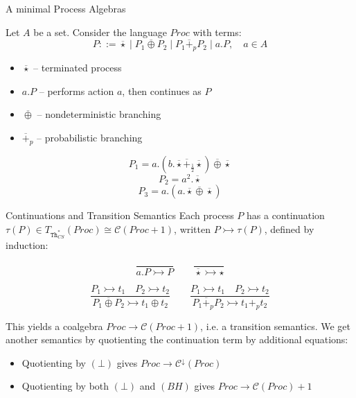 \documentclass{beamer}
\newcommand{\Th}{\mathtt{Th}}
\begin{document}
\begin{frame}{A minimal Process Algebras}

Let $A$ be a set. Consider the language $\mathit{Proc}$ with terms:
\[
P ::= \operatorname{\overline{\star}} \mid P_1 \mathbin{\overline{\oplus}} P_2 \mid P_1 \mathbin{\overline{+}_p} P_2 \mid a.P, \quad a \in A
\]

\pause

\begin{itemize}
    \item $\operatorname{\overline{\star}}$ -- terminated process
    \item $a.P$ -- performs action $a$, then continues as $P$
    \item $\overline{\oplus}$ -- nondeterministic branching
    \item $\overline{+}_p$ -- probabilistic branching
\end{itemize}

\pause

\begin{example}
   $$ P_1 = a.(b.\operatorname{\overline{\star}} \overline +_{\frac12} \operatorname{\overline{\star}}) \mathbin{\overline{\oplus}} \operatorname{\overline{\star}}$$
   $$ P_2 = a^2.\operatorname{\overline{\star}}$$
   $$ P_3 = a.(a.\operatorname{\overline{\star}} \overline \oplus \operatorname{\overline{\star}})$$
   
\end{example}

\end{frame}

\begin{frame}{Continuations and Transition Semantics}
    Each process $P$ has a continuation $\tau(P) \in T_{\Th_{CS}^*}(Proc) \cong \mathcal{C}(Proc+1)$, written $P \rightarrowtail \tau(P)$, defined by induction:

\pause
\[
\frac{}{a.P \rightarrowtail P} \qquad
\frac{}{\operatorname{\overline{\star}} \rightarrowtail \star}
\]

\[
\frac{P_1 \rightarrowtail t_1 \quad P_2 \rightarrowtail t_2}
     {P_1 \mathbin{\overline{\oplus}} P_2 \rightarrowtail t_1 \oplus t_2} 
\qquad
\frac{P_1 \rightarrowtail t_1 \quad P_2 \rightarrowtail t_2}
     {P_1 \mathbin{\overline{+}_p} P_2 \rightarrowtail t_1 +_p t_2}
\]
\pause 
\vspace{\baselineskip}

This yields a coalgebra $Proc \to \mathcal{C}(Proc+1)$, i.e. a transition semantics. \pause We get another semantics by quotienting the continuation term by additional equations:

\begin{itemize}
    \item Quotienting by $(\bot)$ gives $Proc \to \mathcal{C}^\downarrow(Proc)$
    \item Quotienting by both $(\bot)$ and $(BH)$ gives $Proc \to \mathcal{C}(Proc)+1$
\end{itemize}

\end{frame}
\end{document}
